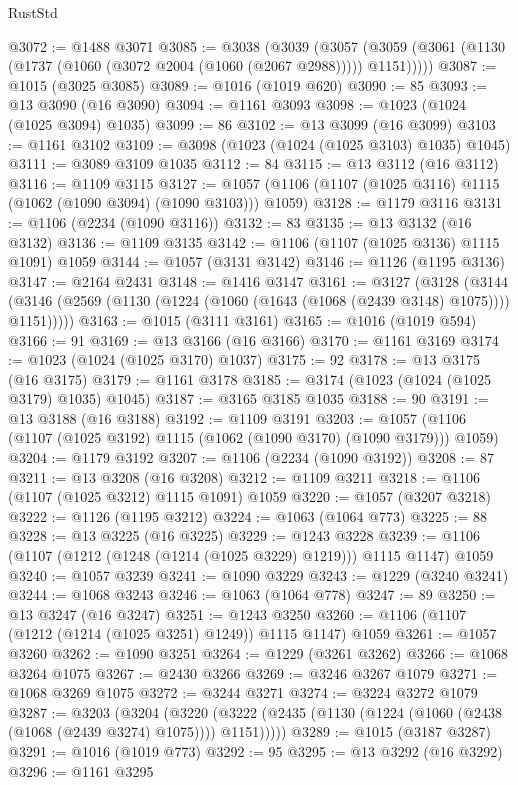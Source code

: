 \begin{lexlean}{RustStd}
\begin{coremodule}
{\begin{coremodule}
{{{{{{{{{{{{{{{{{{{{{{{{{{{{{{{{{{{@3072 := @1488 @3071
@3085 := @3038
    (@3039
      (@3057 (@3059 (@3061 (@1130 (@1737 (@1060 (@3072 @2004 (@1060 (@2067 @2988))))) @1151)))))
@3087 := @1015 (@3025 @3085)
@3089 := @1016 (@1019 @620)
@3090 := 85
@3093 := @13 @3090 (@16 @3090)
@3094 := @1161 @3093
@3098 := @1023 (@1024 (@1025 @3094) @1035)
@3099 := 86
@3102 := @13 @3099 (@16 @3099)
@3103 := @1161 @3102
@3109 := @3098 (@1023 (@1024 (@1025 @3103) @1035) @1045)
@3111 := @3089 @3109 @1035
@3112 := 84
@3115 := @13 @3112 (@16 @3112)
@3116 := @1109 @3115
@3127 := @1057 (@1106 (@1107 (@1025 @3116) @1115 (@1062 (@1090 @3094) (@1090 @3103))) @1059)
@3128 := @1179 @3116
@3131 := @1106 (@2234 (@1090 @3116))
@3132 := 83
@3135 := @13 @3132 (@16 @3132)
@3136 := @1109 @3135
@3142 := @1106 (@1107 (@1025 @3136) @1115 @1091) @1059
@3144 := @1057 (@3131 @3142)
@3146 := @1126 (@1195 @3136)
@3147 := @2164 @2431
@3148 := @1416 @3147
@3161 := @3127
    (@3128
      (@3144 (@3146 (@2569 (@1130 (@1224 (@1060 (@1643 (@1068 (@2439 @3148) @1075)))) @1151)))))
@3163 := @1015 (@3111 @3161)
@3165 := @1016 (@1019 @594)
@3166 := 91
@3169 := @13 @3166 (@16 @3166)
@3170 := @1161 @3169
@3174 := @1023 (@1024 (@1025 @3170) @1037)
@3175 := 92
@3178 := @13 @3175 (@16 @3175)
@3179 := @1161 @3178
@3185 := @3174 (@1023 (@1024 (@1025 @3179) @1035) @1045)
@3187 := @3165 @3185 @1035
@3188 := 90
@3191 := @13 @3188 (@16 @3188)
@3192 := @1109 @3191
@3203 := @1057 (@1106 (@1107 (@1025 @3192) @1115 (@1062 (@1090 @3170) (@1090 @3179))) @1059)
@3204 := @1179 @3192
@3207 := @1106 (@2234 (@1090 @3192))
@3208 := 87
@3211 := @13 @3208 (@16 @3208)
@3212 := @1109 @3211
@3218 := @1106 (@1107 (@1025 @3212) @1115 @1091) @1059
@3220 := @1057 (@3207 @3218)
@3222 := @1126 (@1195 @3212)
@3224 := @1063 (@1064 @773)
@3225 := 88
@3228 := @13 @3225 (@16 @3225)
@3229 := @1243 @3228
@3239 := @1106 (@1107 (@1212 (@1248 (@1214 (@1025 @3229) @1219))) @1115 @1147) @1059
@3240 := @1057 @3239
@3241 := @1090 @3229
@3243 := @1229 (@3240 @3241)
@3244 := @1068 @3243
@3246 := @1063 (@1064 @778)
@3247 := 89
@3250 := @13 @3247 (@16 @3247)
@3251 := @1243 @3250
@3260 := @1106 (@1107 (@1212 (@1214 (@1025 @3251) @1249)) @1115 @1147) @1059
@3261 := @1057 @3260
@3262 := @1090 @3251
@3264 := @1229 (@3261 @3262)
@3266 := @1068 @3264 @1075
@3267 := @2430 @3266
@3269 := @3246 @3267 @1079
@3271 := @1068 @3269 @1075
@3272 := @3244 @3271
@3274 := @3224 @3272 @1079
@3287 := @3203
    (@3204
      (@3220 (@3222 (@2435 (@1130 (@1224 (@1060 (@2438 (@1068 (@2439 @3274) @1075)))) @1151)))))
@3289 := @1015 (@3187 @3287)
@3291 := @1016 (@1019 @773)
@3292 := 95
@3295 := @13 @3292 (@16 @3292)
@3296 := @1161 @3295
}}}}}}}}}}}}}}}}}}}}}}}}}}}}}}}}}}}
\end{coremodule}}
\end{coremodule}
\end{lexlean}
